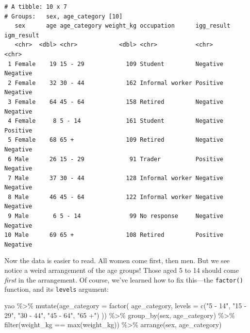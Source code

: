 \documentclass[
  letterpaper,
  DIV=11,
  numbers=noendperiod]{scrreprt}
\newenvironment{Shaded}{\begin{snugshade}}{\end{snugshade}}
\newcommand{\AttributeTok}[1]{\textcolor[rgb]{0.40,0.45,0.13}{#1}}
\newcommand{\FunctionTok}[1]{\textcolor[rgb]{0.28,0.35,0.67}{#1}}
\newcommand{\NormalTok}[1]{\textcolor[rgb]{0.00,0.23,0.31}{#1}}
\newcommand{\SpecialCharTok}[1]{\textcolor[rgb]{0.37,0.37,0.37}{#1}}
\newcommand{\StringTok}[1]{\textcolor[rgb]{0.13,0.47,0.30}{#1}}
\begin{document}
\begin{verbatim}
# A tibble: 10 x 7
# Groups:   sex, age_category [10]
   sex      age age_category weight_kg occupation      igg_result igm_result
   <chr>  <dbl> <chr>            <dbl> <chr>           <chr>      <chr>     
 1 Female    19 15 - 29            109 Student         Negative   Negative  
 2 Female    32 30 - 44            162 Informal worker Positive   Negative  
 3 Female    64 45 - 64            158 Retired         Negative   Negative  
 4 Female     8 5 - 14             161 Student         Negative   Positive  
 5 Female    68 65 +               109 Retired         Negative   Negative  
 6 Male      26 15 - 29             91 Trader          Positive   Negative  
 7 Male      37 30 - 44            128 Informal worker Negative   Negative  
 8 Male      46 45 - 64            122 Informal worker Negative   Negative  
 9 Male       6 5 - 14              99 No response     Negative   Negative  
10 Male      69 65 +               108 Retired         Positive   Negative  
\end{verbatim}

Now the data is easier to read. All women come first, then men. But we
see notice a weird arrangement of the age groups! Those aged 5 to 14
should come \emph{first} in the arrangement. Of course, we've learned
how to fix this---the \texttt{factor()} function, and its
\texttt{levels} argument:

\begin{Shaded}
\begin{Highlighting}[]
\NormalTok{yao }\SpecialCharTok{\%\textgreater{}\%}
  \FunctionTok{mutate}\NormalTok{(}\AttributeTok{age\_category =} \FunctionTok{factor}\NormalTok{(}
\NormalTok{    age\_category,}
    \AttributeTok{levels =} \FunctionTok{c}\NormalTok{(}\StringTok{"5 {-} 14"}\NormalTok{, }\StringTok{"15 {-} 29"}\NormalTok{, }\StringTok{"30 {-} 44"}\NormalTok{, }\StringTok{"45 {-} 64"}\NormalTok{, }\StringTok{"65 +"}\NormalTok{)}
\NormalTok{  )) }\SpecialCharTok{\%\textgreater{}\%}
  \FunctionTok{group\_by}\NormalTok{(sex, age\_category) }\SpecialCharTok{\%\textgreater{}\%}
  \FunctionTok{filter}\NormalTok{(weight\_kg }\SpecialCharTok{==} \FunctionTok{max}\NormalTok{(weight\_kg)) }\SpecialCharTok{\%\textgreater{}\%}
  \FunctionTok{arrange}\NormalTok{(sex, age\_category)}
\end{Highlighting}
\end{Shaded}
\end{document}
